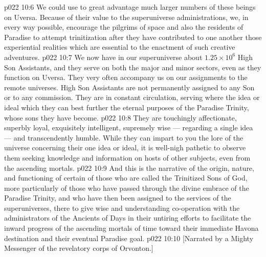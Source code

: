 \vs p022 10:6 We could use to great advantage much larger numbers of these beings on Uversa. Because of their value to the superuniverse administrations, we, in every way possible, encourage the pilgrims of space and also the residents of Paradise to attempt trinitization after they have contributed to one another those experiential realities which are essential to the enactment of such creative adventures.
\vs p022 10:7 \pc We now have in our superuniverse about $1.25 \times 10^6$ High Son Assistants, and they serve on both the major and minor sectors, even as they function on Uversa. They very often accompany us on our assignments to the remote universes. High Son Assistants are not permanently assigned to any Son or to any commission. They are in constant circulation, serving where the idea or ideal which they  can best further the eternal purposes of the Paradise Trinity, whose sons they have become.
\vs p022 10:8 They are touchingly affectionate, superbly loyal, exquisitely intelligent, supremely wise --- regarding a single idea --- and transcendently humble. While they can impart to you the lore of the universe concerning their one idea or ideal, it is well\hyp{}nigh pathetic to observe them seeking knowledge and information on hosts of other subjects, even from the ascending mortals.
\vs p022 10:9 \pc And this is the narrative of the origin, nature, and functioning of certain of those who are called the Trinitized Sons of God, more particularly of those who have passed through the divine embrace of the Paradise Trinity, and who have then been assigned to the services of the superuniverses, there to give wise and understanding co\hyp{}operation with the administrators of the Ancients of Days in their untiring efforts to facilitate the inward progress of the ascending mortals of time toward their immediate Havona destination and their eventual Paradise goal.
\vsetoff
\vs p022 10:10 [Narrated by a Mighty Messenger of the revelatory corps of Orvonton.]
\quizlink
